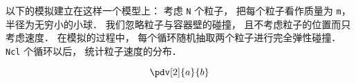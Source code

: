 
以下的模拟建立在这样一个模型上： 考虑 \lstinline|N| 个粒子， 把每个粒子看作质量为 \lstinline|m|， 半径为无穷小的小球． 我们忽略粒子与容器壁的碰撞， 且不考虑粒子的位置而只考虑速度． 在模拟的过程中， 每个循环随机抽取两个粒子进行完全弹性碰撞． \lstinline|Ncl| 个循环以后， 统计粒子速度的分布．

\begin{equation}
\pdv[2]{a}{b}
\end{equation}

